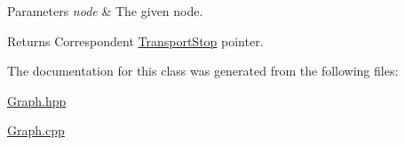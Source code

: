 \begin{DoxyParams}{Parameters}
{\em node} & The given node.\\
\hline
\end{DoxyParams}
\begin{DoxyReturn}{Returns}
Correspondent \hyperlink{class_transport_stop}{Transport\+Stop} pointer. 
\end{DoxyReturn}


The documentation for this class was generated from the following files\+:\begin{DoxyCompactItemize}
\item 
\hyperlink{_graph_8hpp}{Graph.\+hpp}\item 
\hyperlink{_graph_8cpp}{Graph.\+cpp}\end{DoxyCompactItemize}
